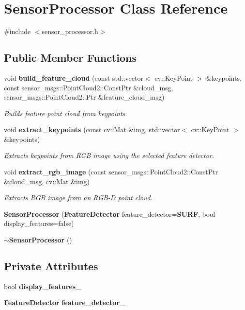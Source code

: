 \section{\-Sensor\-Processor \-Class \-Reference}
\label{classSensorProcessor}


{\ttfamily \#include $<$sensor\-\_\-processor.\-h$>$}

\subsection*{\-Public \-Member \-Functions}
\begin{DoxyCompactItemize}
\item 
void {\bf build\-\_\-feature\-\_\-cloud} (const std\-::vector$<$ cv\-::\-Key\-Point $>$ \&keypoints, const sensor\-\_\-msgs\-::\-Point\-Cloud2\-::\-Const\-Ptr \&cloud\-\_\-msg, sensor\-\_\-msgs\-::\-Point\-Cloud2\-::\-Ptr \&feature\-\_\-cloud\-\_\-msg)
\begin{DoxyCompactList}\small\item\em \-Builds feature point cloud from keypoints. \end{DoxyCompactList}\item 
void {\bf extract\-\_\-keypoints} (const cv\-::\-Mat \&img, std\-::vector$<$ cv\-::\-Key\-Point $>$ \&keypoints)
\begin{DoxyCompactList}\small\item\em \-Extracts keypoints from \-R\-G\-B image using the selected feature detector. \end{DoxyCompactList}\item 
void {\bf extract\-\_\-rgb\-\_\-image} (const sensor\-\_\-msgs\-::\-Point\-Cloud2\-::\-Const\-Ptr \&cloud\-\_\-msg, cv\-::\-Mat \&img)
\begin{DoxyCompactList}\small\item\em \-Extracts \-R\-G\-B image from an \-R\-G\-B-\/\-D point cloud. \end{DoxyCompactList}\item 
{\bf \-Sensor\-Processor} ({\bf \-Feature\-Detector} feature\-\_\-detector={\bf \-S\-U\-R\-F}, bool display\-\_\-features=false)
\item 
{\bf $\sim$\-Sensor\-Processor} ()
\end{DoxyCompactItemize}
\subsection*{\-Private \-Attributes}
\begin{DoxyCompactItemize}
\item 
bool {\bf display\-\_\-features\-\_\-}
\item 
{\bf \-Feature\-Detector} {\bf feature\-\_\-detector\-\_\-}
\end{DoxyCompactItemize}


